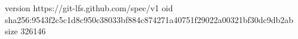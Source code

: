 version https://git-lfs.github.com/spec/v1
oid sha256:9543f2c5c1d8c950c38033bf884c874271a40751f29022a00321bf30dc9db2ab
size 326146
